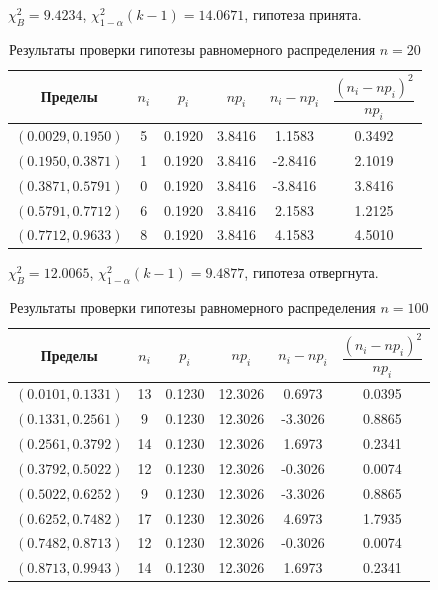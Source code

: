 \documentclass[12pt,a4paper]{article}
\begin{document}
	\( \chi_B^2 = 9.4234 \), \( \chi_{1 - \alpha}^2 (k - 1) = 14.0671 \),
	гипотеза принята.

	\clearpage

	\begin{table}[htbp]
		\centering
		\begin{tabular}{ |c|c|c|c|c|c| }
			\hline
			Пределы & \( n_i \) & \( p_i \) & \( np_i \) & \( n_i - np_i \)
			& \( \dfrac{(n_i - np_i)^2}{np_i} \) \\
			\hline
			\( (0.0029, 0.1950) \) & 5 & 0.1920 & 3.8416 & 1.1583 & 0.3492 \\
			\hline
			\( (0.1950, 0.3871) \) & 1 & 0.1920 & 3.8416 & -2.8416 & 2.1019 \\
			\hline
			\( (0.3871, 0.5791) \) & 0 & 0.1920 & 3.8416 & -3.8416 & 3.8416 \\
			\hline
			\( (0.5791, 0.7712) \) & 6 & 0.1920 & 3.8416 & 2.1583 & 1.2125 \\
			\hline
			\( (0.7712, 0.9633) \) & 8 & 0.1920 & 3.8416 & 4.1583 & 4.5010 \\
			\hline
		\end{tabular}
		\caption{Результаты проверки гипотезы равномерного распределения
			\( n = 20 \)}
	\end{table}

	\( \chi_B^2 = 12.0065 \), \( \chi_{1 - \alpha}^2 (k - 1) = 9.4877 \),
	гипотеза отвергнута.

	\begin{table}[htbp]
		\centering
		\begin{tabular}{ |c|c|c|c|c|c| }
			\hline
			Пределы & \( n_i \) & \( p_i \) & \( np_i \) & \( n_i - np_i \)
			& \( \dfrac{(n_i - np_i)^2}{np_i} \) \\
			\hline
			\( (0.0101, 0.1331) \) & 13 & 0.1230 & 12.3026 & 0.6973 & 0.0395 \\
			\hline
			\( (0.1331, 0.2561) \) & 9 & 0.1230 & 12.3026 & -3.3026 & 0.8865 \\
			\hline
			\( (0.2561, 0.3792) \) & 14 & 0.1230 & 12.3026 & 1.6973 & 0.2341 \\
			\hline
			\( (0.3792, 0.5022) \) & 12 & 0.1230 & 12.3026 & -0.3026 & 0.0074 \\
			\hline
			\( (0.5022, 0.6252) \) & 9 & 0.1230 & 12.3026 & -3.3026 & 0.8865 \\
			\hline
			\( (0.6252, 0.7482) \) & 17 & 0.1230 & 12.3026 & 4.6973 & 1.7935 \\
			\hline
			\( (0.7482, 0.8713) \) & 12 & 0.1230 & 12.3026 & -0.3026 & 0.0074 \\
			\hline
			\( (0.8713, 0.9943) \) & 14 & 0.1230 & 12.3026 & 1.6973 & 0.2341 \\
			\hline
		\end{tabular}
		\caption{Результаты проверки гипотезы равномерного распределения
			\( n = 100 \)}
	\end{table}
\end{document}
